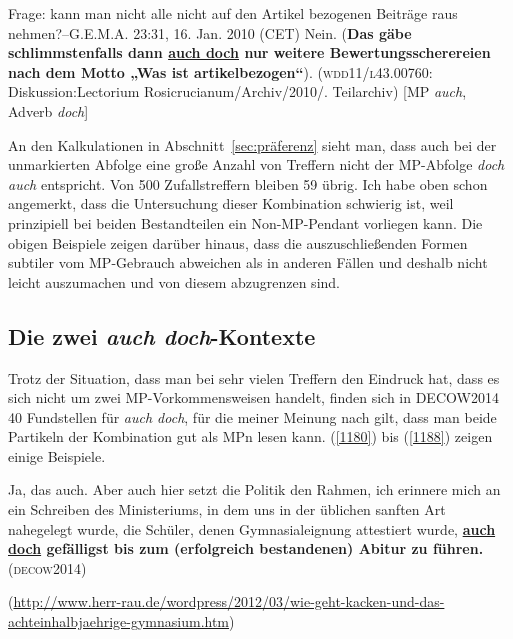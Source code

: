 \begin{exe}
	\ex\label{1179} 
	Frage: kann man nicht alle nicht auf den Artikel bezogenen Beiträge raus nehmen?--G.E.M.A. 23:31, 16. Jan. 2010 (CET)
	Nein. (\textbf{Das gäbe schlimmstenfalls dann \ul{auch doch} nur weitere Bewertungs\-scherereien nach dem Motto „Was ist artikelbezogen“}). 
	\newline
	(\textsc{wdd11/l43.00760}: Diskussion:Lectorium Rosicrucianum\slash Archiv\slash 2010\slash{}. Teilarchiv) [MP \textit{auch}, Adverb \textit{doch}]
\end{exe}
An den Kalkulationen in Abschnitt~\ref{sec:präferenz} sieht man, dass auch bei der unmarkierten Abfolge eine große Anzahl von Treffern nicht der MP-Abfolge \textit{doch auch} entspricht. Von 500 Zufallstreffern bleiben 59 übrig. Ich habe oben schon angemerkt, dass die Untersuchung dieser Kombination schwierig ist, weil prinzipiell bei beiden Bestandteilen ein Non-MP-Pendant vorliegen kann. Die obigen Beispiele zeigen darüber hinaus, dass die auszuschließenden Formen subtiler vom MP-Gebrauch abweichen als in anderen Fällen und deshalb nicht leicht auszumachen und von diesem abzugrenzen sind. 	

\subsection{Die zwei \textit{auch doch}-Kontexte}\largerpage
Trotz der Situation, dass man bei sehr vielen Treffern den Eindruck hat, dass es sich nicht um zwei MP-Vorkommensweisen handelt, finden sich in DECOW2014 40 Fundstellen für \textit{auch doch}, für die meiner Meinung nach gilt, dass man beide Partikeln der Kombination gut als MPn lesen kann. (\ref{1180}) bis (\ref{1188}) zeigen einige Beispiele.

\begin{exe}
	\ex\label{1180} 

	Ja, das auch. Aber auch hier setzt die Politik den Rahmen, ich erinnere mich an ein Schreiben des Ministeriums, in dem uns in der üblichen sanften Art 		nahegelegt wurde, die Schüler, denen Gymnasialeignung attestiert wurde, \textbf{\ul{auch doch} gefälligst bis zum (erfolgreich bestandenen) 			Abitur zu führen.}
	\hfill\hbox{\scshape(decow2014)}	
	\begin{sloppypar}
	{\scriptsize(\url{http://www.herr-rau.de/wordpress/2012/03/wie-geht-kacken-und-das-achteinhalbjaehrige-gymnasium.htm})}\end{sloppypar}
\end{exe}

